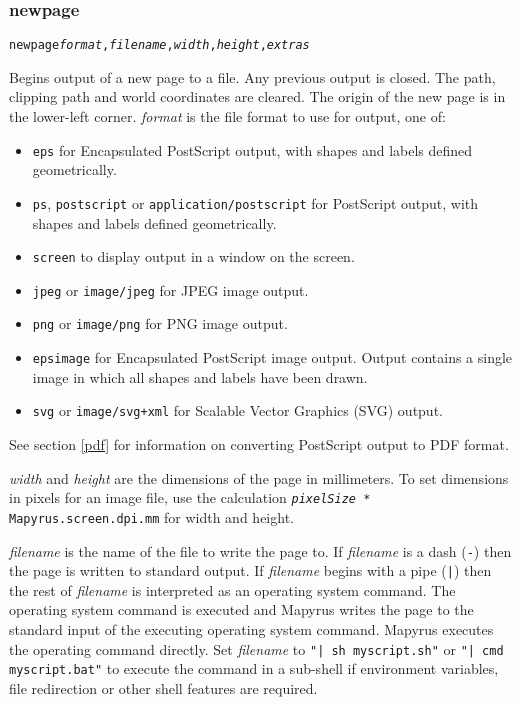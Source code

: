 \subsubsection{newpage}

\begin{alltt}
newpage \textit{format}, \textit{filename}, \textit{width}, \textit{height}, \textit{extras}
\end{alltt}

Begins output of a new page to a file.  Any previous output is closed.  The
path, clipping path and world coordinates are cleared.  The origin of
the new page is in the lower-left corner.  \textit{format} is the
file format to use for output, one of:

\begin{itemize}
\item
\texttt{eps} for Encapsulated PostScript output,
with shapes and labels defined geometrically.
\item
\texttt{ps}, \texttt{postscript} or \texttt{application/postscript}
for PostScript output,
with shapes and labels defined geometrically.
\item
\texttt{screen} to display output in a window on the screen.
\item
\texttt{jpeg} or \texttt{image/jpeg} for JPEG image output.
\item
\texttt{png} or \texttt{image/png} for PNG image output.
\item
\texttt{epsimage} for Encapsulated PostScript image output.
Output contains
a single image in which all shapes and labels have been drawn.
\item
\texttt{svg} or \texttt{image/svg+xml} for Scalable Vector Graphics
(SVG) output.
\end{itemize}

See section \ref{pdf} for
information on converting PostScript output to PDF format.

\textit{width} and \textit{height} are the dimensions of the page
in millimeters.  To set dimensions in pixels for an image file,
use the calculation
\texttt{\textit{pixelSize} * Mapyrus.screen.dpi.mm} for
width and height.

\textit{filename} is the name of the file to write the page to.
If \textit{filename} is a dash (\texttt{-})
then the page is written to standard output.
If \textit{filename} begins with a pipe (\texttt{|}) then the rest
of \textit{filename} is interpreted as an operating system
command.  The operating system command is executed and Mapyrus
writes the page to the standard input of the executing
operating system command.
Mapyrus executes the operating command directly.  Set \textit{filename} to
\texttt{"| sh myscript.sh"}
or
\texttt{"| cmd myscript.bat"}
to execute the command in a sub-shell if 
environment variables, file redirection or other shell features are
required.

